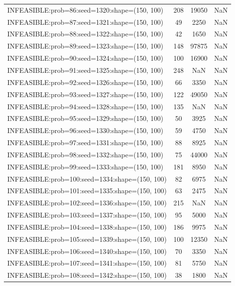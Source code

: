 \begin{longtable}{lccc}
INFEASIBLE:prob=86:seed=1320:shape=(150, 100)  &   208 & 19050 &    NaN \\
INFEASIBLE:prob=87:seed=1321:shape=(150, 100)  &    49 &  2250 &    NaN \\
INFEASIBLE:prob=88:seed=1322:shape=(150, 100)  &    42 &  1650 &    NaN \\
INFEASIBLE:prob=89:seed=1323:shape=(150, 100)  &   148 & 97875 &    NaN \\
INFEASIBLE:prob=90:seed=1324:shape=(150, 100)  &   100 & 16900 &    NaN \\
INFEASIBLE:prob=91:seed=1325:shape=(150, 100)  &   248 &   NaN &    NaN \\
INFEASIBLE:prob=92:seed=1326:shape=(150, 100)  &    66 &  3350 &    NaN \\
INFEASIBLE:prob=93:seed=1327:shape=(150, 100)  &   122 & 49050 &    NaN \\
INFEASIBLE:prob=94:seed=1328:shape=(150, 100)  &   135 &   NaN &    NaN \\
INFEASIBLE:prob=95:seed=1329:shape=(150, 100)  &    50 &  3925 &    NaN \\
INFEASIBLE:prob=96:seed=1330:shape=(150, 100)  &    59 &  4750 &    NaN \\
INFEASIBLE:prob=97:seed=1331:shape=(150, 100)  &    88 &  8925 &    NaN \\
INFEASIBLE:prob=98:seed=1332:shape=(150, 100)  &    75 & 44000 &    NaN \\
INFEASIBLE:prob=99:seed=1333:shape=(150, 100)  &   181 &  8950 &    NaN \\
INFEASIBLE:prob=100:seed=1334:shape=(150, 100) &    82 &  6975 &    NaN \\
INFEASIBLE:prob=101:seed=1335:shape=(150, 100) &    63 &  2475 &    NaN \\
INFEASIBLE:prob=102:seed=1336:shape=(150, 100) &   215 &   NaN &    NaN \\
INFEASIBLE:prob=103:seed=1337:shape=(150, 100) &    95 &  5000 &    NaN \\
INFEASIBLE:prob=104:seed=1338:shape=(150, 100) &   186 &  9975 &    NaN \\
INFEASIBLE:prob=105:seed=1339:shape=(150, 100) &   100 & 12350 &    NaN \\
INFEASIBLE:prob=106:seed=1340:shape=(150, 100) &    70 &  3350 &    NaN \\
INFEASIBLE:prob=107:seed=1341:shape=(150, 100) &    81 &  5750 &    NaN \\
INFEASIBLE:prob=108:seed=1342:shape=(150, 100) &    38 &  1800 &    NaN \\

\end{longtable}
